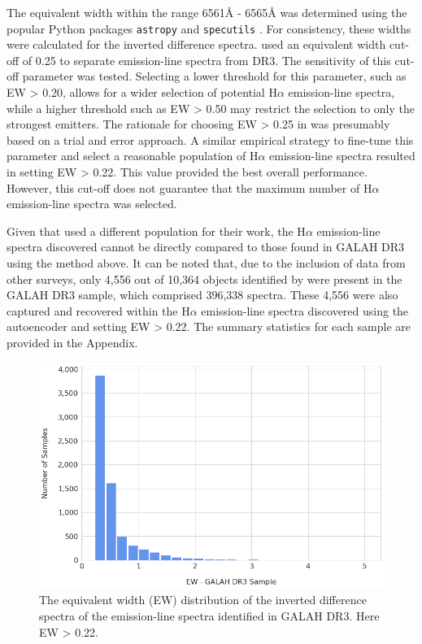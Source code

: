 The equivalent width within the range 6561\r{A} - 6565\r{A} was determined using the popular Python packages \texttt{astropy} \citep{astropy:2018, astropy:2013} and \texttt{specutils} \citep{specutils}. For consistency, these widths were calculated for the inverted difference spectra. \citet{vcotar2021galah} used an equivalent width cut-off of 0.25 to separate emission-line spectra from DR3. The sensitivity of this cut-off parameter was tested. Selecting a lower threshold for this parameter, such as EW > 0.20,  allows for a wider selection of potential H$\alpha$ emission-line spectra, while a higher threshold such as EW > 0.50 may restrict the selection to only the strongest emitters. The rationale for choosing EW > 0.25 in \citet{vcotar2021galah} was presumably based on a trial and error approach. A similar empirical strategy to fine-tune this parameter and select a reasonable population of H$\alpha$ emission-line spectra resulted in setting EW > 0.22. This value provided the best overall performance. However, this cut-off does not guarantee that the maximum number of H$\alpha$ emission-line spectra was selected. 

Given that \citet{vcotar2021galah} used a different population for their work, the H$\alpha$ emission-line spectra discovered cannot be directly compared to those found in GALAH DR3 using the method above. It can be noted that, due to the inclusion of data from other surveys, only 4,556 out of 10,364 objects identified by \citet{vcotar2021galah} were present in the GALAH DR3 sample, which comprised 396,338 spectra. These 4,556 were also captured and recovered within the H$\alpha$ emission-line spectra discovered using the autoencoder and setting EW > 0.22. The summary statistics for each sample are provided in the Appendix.

\begin{figure}[!htb]
\centering
\includegraphics[scale=0.50]{figures/EW hist.png}
\caption{The equivalent width (EW) distribution of the inverted difference spectra of the emission-line spectra identified in GALAH DR3. Here EW > 0.22.}
\end{figure}



